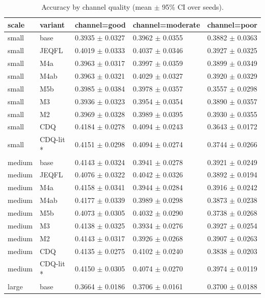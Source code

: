 \begin{table}[t]\centering\footnotesize
\caption{Accuracy by channel quality (mean $\pm$ 95\% CI over seeds).}\label{tab:table2_accuracy_by_channel}
\begin{tabular}{lllll}
\toprule
scale & variant & channel=good & channel=moderate & channel=poor \\
\midrule
small & base & 0.3935 $\pm$ 0.0327 & 0.3962 $\pm$ 0.0355 & 0.3882 $\pm$ 0.0363 \\
small & JEQFL & 0.4019 $\pm$ 0.0333 & 0.4037 $\pm$ 0.0346 & 0.3927 $\pm$ 0.0325 \\
small & M4a & 0.3963 $\pm$ 0.0317 & 0.3997 $\pm$ 0.0359 & 0.3899 $\pm$ 0.0349 \\
small & M4ab & 0.3963 $\pm$ 0.0321 & 0.4029 $\pm$ 0.0327 & 0.3920 $\pm$ 0.0329 \\
small & M5b & 0.3985 $\pm$ 0.0384 & 0.3978 $\pm$ 0.0357 & 0.3557 $\pm$ 0.0298 \\
small & M3 & 0.3936 $\pm$ 0.0323 & 0.3954 $\pm$ 0.0354 & 0.3890 $\pm$ 0.0357 \\
small & M2 & 0.3969 $\pm$ 0.0328 & 0.3989 $\pm$ 0.0395 & 0.3930 $\pm$ 0.0355 \\
small & CDQ & 0.4184 $\pm$ 0.0278 & 0.4094 $\pm$ 0.0243 & 0.3643 $\pm$ 0.0172 \\
small & CDQ-lit * & 0.4151 $\pm$ 0.0298 & 0.4094 $\pm$ 0.0274 & 0.3744 $\pm$ 0.0266 \\
medium & base & 0.4143 $\pm$ 0.0324 & 0.3941 $\pm$ 0.0278 & 0.3921 $\pm$ 0.0249 \\
medium & JEQFL & 0.4076 $\pm$ 0.0322 & 0.4042 $\pm$ 0.0326 & 0.3892 $\pm$ 0.0194 \\
medium & M4a & 0.4158 $\pm$ 0.0341 & 0.3944 $\pm$ 0.0284 & 0.3916 $\pm$ 0.0242 \\
medium & M4ab & 0.4177 $\pm$ 0.0339 & 0.3989 $\pm$ 0.0298 & 0.3873 $\pm$ 0.0238 \\
medium & M5b & 0.4073 $\pm$ 0.0305 & 0.4032 $\pm$ 0.0290 & 0.3738 $\pm$ 0.0268 \\
medium & M3 & 0.4138 $\pm$ 0.0325 & 0.3934 $\pm$ 0.0276 & 0.3927 $\pm$ 0.0254 \\
medium & M2 & 0.4143 $\pm$ 0.0317 & 0.3926 $\pm$ 0.0268 & 0.3907 $\pm$ 0.0263 \\
medium & CDQ & 0.4135 $\pm$ 0.0275 & 0.4102 $\pm$ 0.0240 & 0.3838 $\pm$ 0.0203 \\
medium & CDQ-lit * & 0.4150 $\pm$ 0.0305 & 0.4074 $\pm$ 0.0270 & 0.3974 $\pm$ 0.0119 \\
large & base & 0.3664 $\pm$ 0.0186 & 0.3706 $\pm$ 0.0161 & 0.3700 $\pm$ 0.0188 \\

\end{tabular}
\end{table}
